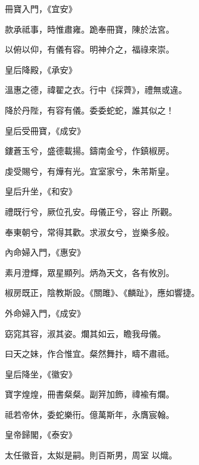 \begin{pinyinscope}
 冊寶入門，《宜安》



 款承祗事，時惟肅雍。跪奉冊寶，陳於法宮。



 以俯以仰，有儀有容。明神介之，福祿來崇。



 皇后降殿，《承安》



 溫惠之德，禕翟之衣。行中《採薺》，禮無或違。



 降於丹陛，有容有儀。委委蛇蛇，誰其似之！



 皇后受冊寶，《成安》



 鏤蒼玉兮，盛德載揚。鑄南金兮，作鎮椒房。



 虔受賜兮，有燁有光。宜室家兮，朱芾斯皇。



 皇后升坐，《和安》



 禮既行兮，厥位孔安。母儀正兮，容止
 所觀。



 奉東朝兮，常得其歡。求淑女兮，豈樂多般。



 內命婦入門，《惠安》



 素月澄輝，眾星顯列。炳為天文，各有攸別。



 椒房既正，陰教斯設。《關雎》、《麟趾》，應如響捷。



 外命婦入門，《成安》



 窈窕其容，淑其姿。爛其如云，瞻我母儀。



 曰天之妹，作合惟宜。粲然舞抃，疇不肅祗。



 皇后降坐，《徽安》



 寶字煌煌，冊書粲粲。副笄加飾，禕褕有爛。



 祗若帝休，委蛇樂衎。億萬斯年，永膺宸翰。



 皇帝歸閣，《泰安》



 太任徽音，太姒是嗣。則百斯男，周室
 以熾。




\end{pinyinscope}
